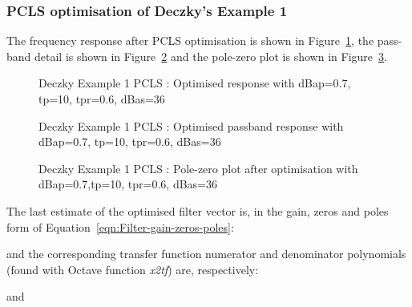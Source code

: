 \documentclass[a4paper,twoside,10pt,english]{report}
\begin{document}
\subsubsection{PCLS optimisation of Deczky's Example 1}
The frequency response after PCLS optimisation is shown in
Figure~\ref{fig:Deczky-Ex1-PCLS-d1}, the pass-band detail is shown in 
Figure~\ref{fig:Deczky-Ex1-PCLS-d1-passband} and the pole-zero plot is shown in 
Figure~\ref{fig:Deczky-Ex1-PCLS-d1-pz}. 
\begin{figure}[!htb]
\begin{center}
\scalebox{0.7}{}
\caption{Deczky Example 1 PCLS : Optimised response with dBap=0.7, tp=10, tpr=0.6, dBas=36}
\label{fig:Deczky-Ex1-PCLS-d1}
\end{center}
\end{figure}
\begin{figure}[!htb]
\begin{center}
\scalebox{0.7}{}
\caption{Deczky Example 1 PCLS : Optimised passband response with dBap=0.7, tp=10, tpr=0.6, dBas=36}
\label{fig:Deczky-Ex1-PCLS-d1-passband}
\end{center}
\end{figure}
\begin{figure}[!htb]
\begin{center}
\scalebox{0.7}{}
\caption{Deczky Example 1 PCLS : Pole-zero plot after optimisation with dBap=0.7,tp=10, tpr=0.6, dBas=36}
\label{fig:Deczky-Ex1-PCLS-d1-pz}
\end{center}
\end{figure}
The last estimate of the optimised filter vector is, in the gain, zeros and 
poles form of Equation~\ref{eqn:Filter-gain-zeros-poles}:
\begin{small}

\end{small}
and the corresponding transfer function numerator and denominator polynomials
(found with Octave function \emph{x2tf}) are, respectively:
\begin{small}

\end{small}
and
\begin{small}

\end{small}
\end{document}
